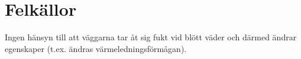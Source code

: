 \section{Felkällor}

Ingen hänsyn till att väggarna tar åt sig fukt vid blött väder och därmed ändrar egenskaper (t.ex. ändras värmeledningsförmågan). 

